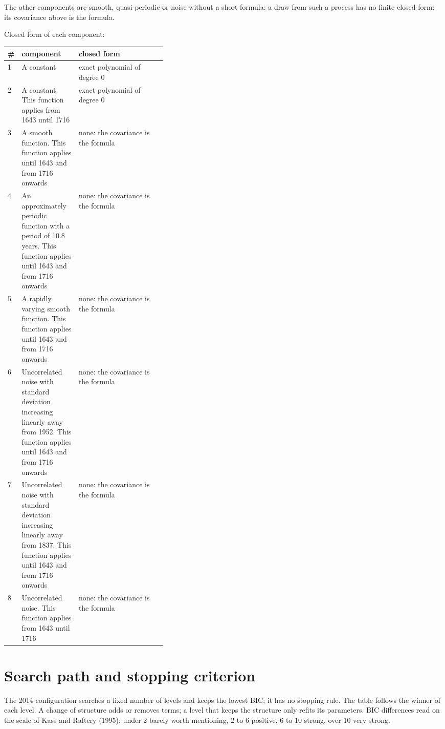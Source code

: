 \documentclass[11pt,a4paper]{article}
\begin{document}
The other components are smooth, quasi-periodic or noise without a short formula: a draw from such a process has no finite closed form; its covariance above is the formula.

Closed form of each component:

\begin{center}\footnotesize
\begin{tabular}{lp{0.36\linewidth}l}
\toprule
\# & component & closed form \\
\midrule
1 & A constant & exact polynomial of degree 0 \\
2 & A constant. This function applies from 1643 until 1716 & exact polynomial of degree 0 \\
3 & A smooth function. This function applies until 1643 and from 1716 onwards & none: the covariance is the formula \\
4 & An approximately periodic function with a period of 10.8 years. This function applies until 1643 and from 1716 onwards & none: the covariance is the formula \\
5 & A rapidly varying smooth function. This function applies until 1643 and from 1716 onwards & none: the covariance is the formula \\
6 & Uncorrelated noise with standard deviation increasing linearly away from 1952. This function applies until 1643 and from 1716 onwards & none: the covariance is the formula \\
7 & Uncorrelated noise with standard deviation increasing linearly away from 1837. This function applies until 1643 and from 1716 onwards & none: the covariance is the formula \\
8 & Uncorrelated noise. This function applies from 1643 until 1716 & none: the covariance is the formula \\
\bottomrule
\end{tabular}
\end{center}

\section*{Search path and stopping criterion}

The 2014 configuration searches a fixed number of levels and keeps the lowest BIC; it has no stopping rule. The table follows the winner of each level. A change of structure adds or removes terms; a level that keeps the structure only refits its parameters. BIC differences read on the scale of Kass and Raftery (1995): under 2 barely worth mentioning, 2 to 6 positive, 6 to 10 strong, over 10 very strong.
\end{document}
